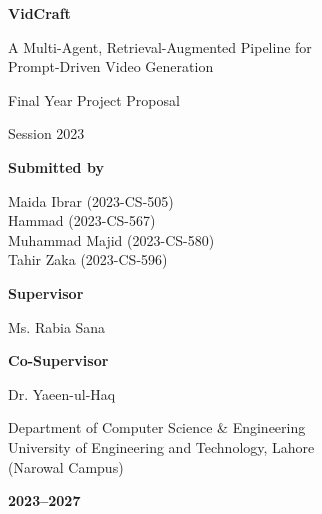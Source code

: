 \documentclass[11pt,a4paper]{article}
\begin{document}
\begin{titlepage}
\centering
\vspace*{1.5cm}

{\Huge\bfseries VidCraft\par}
\vspace{0.4cm}
{\Large A Multi-Agent, Retrieval-Augmented Pipeline for\\ Prompt-Driven Video Generation\par}

\vspace{1.2cm}
{\large Final Year Project Proposal\par}
{\large Session 2023\par}

\vspace{1.2cm}
{\large\bfseries Submitted by\par}
\vspace{0.4cm}
{\large
Maida Ibrar (2023-CS-505)\\
Hammad (2023-CS-567)\\
Muhammad Majid (2023-CS-580)\\
Tahir Zaka (2023-CS-596)\par
}

\vspace{1.2cm}
{\large\bfseries Supervisor\par}
Ms. Rabia Sana\par
\vspace{0.5cm}
{\large\bfseries Co-Supervisor\par}
Dr. Yaeen-ul-Haq\par

\vspace{1.5cm}

\vspace{1.5cm}
{\large
Department of Computer Science \& Engineering\\
University of Engineering and Technology, Lahore\\
(Narowal Campus)\par
}
\vspace{0.4cm}
{\large\bfseries 2023--2027\par}

\end{titlepage}
\end{document}
